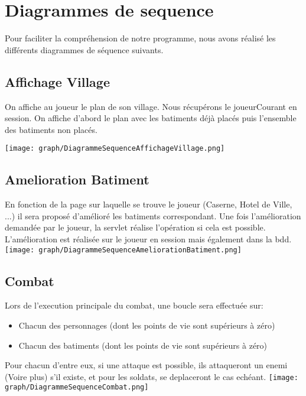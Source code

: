 \chapter{Diagrammes de sequence}
    Pour faciliter la compréhension de notre programme, nous avons réalisé les différents diagrammes de séquence suivants. 

    \section{Affichage Village}

    On affiche au joueur le plan de son village. Nous récupérons le joueurCourant en session. On affiche d'abord le plan avec les batiments déjà placés puis l'ensemble des batiments non placés. 
    
        \texttt{[image: graph/DiagrammeSequenceAffichageVillage.png]}
        
    
    \section{Amelioration Batiment}

    En fonction de la page sur laquelle se trouve le joueur (Caserne, Hotel de Ville, ...) il sera proposé d'amélioré les batiments correspondant. Une fois l'amélioration demandée par le joueur, la servlet réalise l'opération si cela est possible. L'amélioration est réalisée sur le joueur en session mais également dans la bdd.
        \texttt{[image: graph/DiagrammeSequenceAmeliorationBatiment.png]}
        
    
    \section{Combat}
        Lors de l'execution principale du combat, une boucle sera effectuée sur:
        \begin{itemize}
            \item Chacun des personnages (dont les points de vie sont supérieurs à zéro)
            \item Chacun des batiments (dont les points de vie sont supérieurs à zéro)
        \end{itemize}
        Pour chacun d'entre eux, si une attaque est possible, ils attaqueront un enemi (Voire plus) s'il existe, et pour les soldats, se deplaceront le cas echéant.
        \texttt{[image: graph/DiagrammeSequenceCombat.png]}    
    
